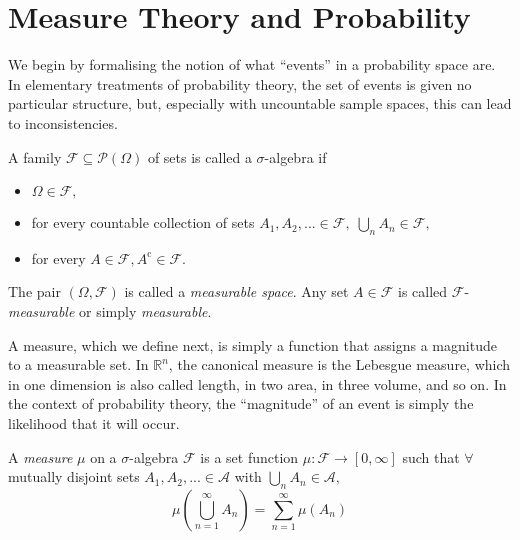 \section{Measure Theory and Probability}\label{sec:1.3}

We begin by formalising the notion of what ``events'' in a probability space are.
In elementary treatments of probability theory, the set of events is given no particular 
structure, but, especially with uncountable sample spaces, this can lead to inconsistencies.

\begin{definition}
    A family $\mathcal{F}\subseteq\mathcal{P}(\Omega)$ of sets is called a $\sigma$-algebra if 
    \begin{itemize}
        \item $\Omega\in\mathcal{F},$
        \item for every countable collection of sets $A_1,A_2,...\in\mathcal{F},\;\bigcup_{n}A_n\in\mathcal{F},$
        \item for every $A\in\mathcal{F}, A^{\mathrm c}\in\mathcal{F}.$
    \end{itemize}
\end{definition}

\begin{remark}
    The pair $(\Omega,\mathcal{F})$ is called a \emph{measurable space}. Any set $A\in\mathcal{F}$
    is called $\mathcal{F}$-\emph{measurable} or simply \emph{measurable}.
\end{remark}

A measure, which we define next, is simply a function that assigns a magnitude 
to a measurable set. In $\mathbb{R}^n$, the canonical measure is the Lebesgue 
measure, which in one dimension is also called length, in two area, in three volume,
and so on. In the context of probability theory, the ``magnitude'' of an event is 
simply the likelihood that it will occur.

\begin{definition}
    A \emph{measure} $\mu$ on a $\sigma$-algebra $\mathcal{F}$ is a set function
    $\mu:\mathcal{F}\rightarrow[0,\infty]$ such that $\forall$ mutually disjoint
    sets $A_1,A_2,...\in\mathcal{A}$ with $\bigcup_nA_n\in\mathcal{A},$
    \begin{equation}
        \mu\left(\bigcup_{n=1}^{\infty}A_n\right)=\sum_{n=1}^{\infty}\mu(A_n)
    \end{equation}
\end{definition}

